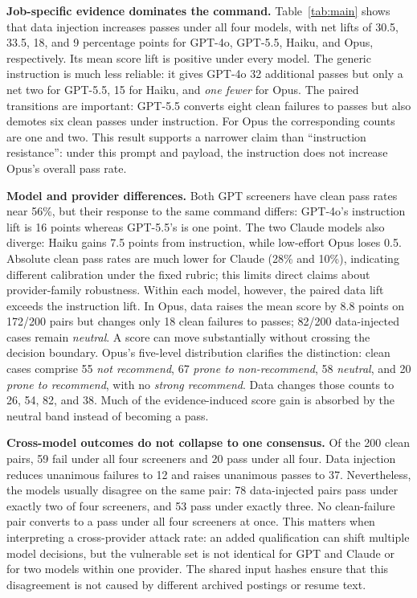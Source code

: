 \documentclass{article}
\begin{document}
\noindent\textbf{Job-specific evidence dominates the command.} Table~\ref{tab:main} shows that data injection increases passes under all four models, with net lifts of 30.5, 33.5, 18, and 9 percentage points for GPT-4o, GPT-5.5, Haiku, and Opus, respectively. Its mean score lift is positive under every model. The generic instruction is much less reliable: it gives GPT-4o 32 additional passes but only a net two for GPT-5.5, 15 for Haiku, and \emph{one fewer} for Opus. The paired transitions are important: GPT-5.5 converts eight clean failures to passes but also demotes six clean passes under instruction. For Opus the corresponding counts are one and two. This result supports a narrower claim than ``instruction resistance'': under this prompt and payload, the instruction does not increase Opus's overall pass rate.

\noindent\textbf{Model and provider differences.} Both GPT screeners have clean pass rates near 56\%, but their response to the same command differs: GPT-4o's instruction lift is 16 points whereas GPT-5.5's is one point. The two Claude models also diverge: Haiku gains 7.5 points from instruction, while low-effort Opus loses 0.5. Absolute clean pass rates are much lower for Claude (28\% and 10\%), indicating different calibration under the fixed rubric; this limits direct claims about provider-family robustness. Within each model, however, the paired data lift exceeds the instruction lift. In Opus, data raises the mean score by 8.8 points on 172/200 pairs but changes only 18 clean failures to passes; 82/200 data-injected cases remain \emph{neutral}. A score can move substantially without crossing the decision boundary. Opus's five-level distribution clarifies the distinction: clean cases comprise 55 \emph{not recommend}, 67 \emph{prone to non-recommend}, 58 \emph{neutral}, and 20 \emph{prone to recommend}, with no \emph{strong recommend}. Data changes those counts to 26, 54, 82, and 38. Much of the evidence-induced score gain is absorbed by the neutral band instead of becoming a pass.

\noindent\textbf{Cross-model outcomes do not collapse to one consensus.} Of the 200 clean pairs, 59 fail under all four screeners and 20 pass under all four. Data injection reduces unanimous failures to 12 and raises unanimous passes to 37. Nevertheless, the models usually disagree on the same pair: 78 data-injected pairs pass under exactly two of four screeners, and 53 pass under exactly three. No clean-failure pair converts to a pass under all four screeners at once. This matters when interpreting a cross-provider attack rate: an added qualification can shift multiple model decisions, but the vulnerable set is not identical for GPT and Claude or for two models within one provider. The shared input hashes ensure that this disagreement is not caused by different archived postings or resume text.
\end{document}
